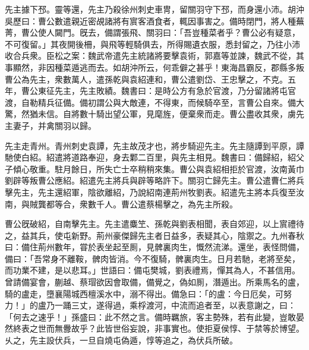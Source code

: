 \begin{pinyinscope}
先主據下邳。靈等還，先主乃殺徐州刺史車冑，留關羽守下邳，而身還小沛。胡沖吳歷曰：曹公數遣親近密覘諸將有賔客酒食者，輒因事害之。備時閉門，將人種蕪菁，曹公使人闚門。旣去，備謂張飛、關羽曰：「吾豈種菜者乎？曹公必有疑意，不可復留。」其夜開後柵，與飛等輕騎俱去，所得賜遺衣服，悉封留之，乃往小沛收合兵衆。臣松之案：魏武帝遣先主統諸將要擊袁術，郭嘉等並諫，魏武不從，其事顯然，非因種菜遁逃而去。如胡沖所云，何乖僻之甚乎！東海昌霸反，郡縣多叛曹公為先主，衆數萬人，遣孫乾與袁紹連和，曹公遣劉岱、王忠擊之，不克。五年，曹公東征先主，先主敗績。魏書曰：是時公方有急於官渡，乃分留諸將屯官渡，自勒精兵征備。備初謂公與大敵連，不得東，而候騎卒至，言曹公自來。備大驚，然猶未信。自將數十騎出望公軍，見麾旌，便棄衆而走。曹公盡收其衆，虜先主妻子，并禽關羽以歸。

先主走青州。青州刺史袁譚，先主故茂才也，將步騎迎先主。先主隨譚到平原，譚馳使白紹。紹遣將道路奉迎，身去鄴二百里，與先主相見。魏書曰：備歸紹，紹父子傾心敬重。駐月餘日，所失亡士卒稍稍來集。曹公與袁紹相拒於官渡，汝南黃巾劉辟等叛曹公應紹。紹遣先主將兵與辟等略許下。關羽亡歸先主。曹公遣曹仁將兵擊先主，先主還紹軍，陰欲離紹，乃說紹南連荊州牧劉表。紹遣先主將本兵復至汝南，與賊龔都等合，衆數千人。曹公遣蔡楊擊之，為先主所殺。

曹公旣破紹，自南擊先主。先主遣麋笁、孫乾與劉表相聞，表自郊迎，以上賔禮待之，益其兵，使屯新野。荊州豪傑歸先主者日益多，表疑其心，陰禦之。九州春秋曰：備住荊州數年，甞於表坐起至厠，見髀裏肉生，慨然流涕。還坐，表怪問備，備曰：「吾常身不離鞍，髀肉皆消。今不復騎，髀裏肉生。日月若馳，老將至矣，而功業不建，是以悲耳。」世語曰：備屯樊城，劉表禮焉，憚其為人，不甚信用。曾請備宴會，蒯越、蔡瑁欲因會取備，備覺之，偽如厠，潛遁出。所乘馬名的盧，騎的盧走，墮襄陽城西檀溪水中，溺不得出。備急曰：「的盧：今日厄矣，可努力！」的盧乃一踊三丈，遂得過，乘桴渡河，中流而追者至，以表意謝之，曰：「何去之速乎！」孫盛曰：此不然之言。備時羈旅，客主勢殊，若有此變，豈敢晏然終表之世而無釁故乎？此皆世俗妄說，非事實也。使拒夏侯惇、于禁等於博望。乆之，先主設伏兵，一旦自燒屯偽遁，惇等追之，為伏兵所破。


\end{pinyinscope}
